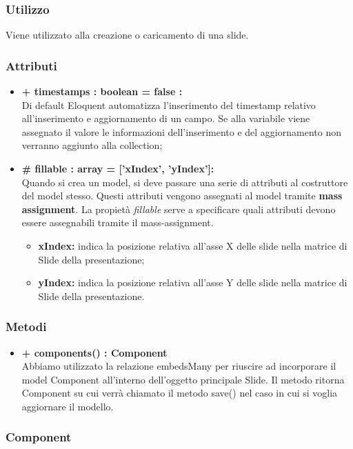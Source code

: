 	\subsubsection*{Utilizzo}
Viene utilizzato alla creazione o caricamento di una slide.

	\subsubsection*{Attributi}
	\begin{itemize}
		\item \textbf{+ timestamps : boolean = false :}\\
		Di default Eloquent automatizza l'inserimento del timestamp relativo all'inserimento e aggiornamento di un campo. Se alla variabile viene assegnato il valore le informazioni dell'inserimento e del aggiornamento non verranno aggiunto alla collection;
		\item \textbf{\# fillable : array = [’xIndex’, ’yIndex']:}\\
		Quando si crea un model, si deve passare una serie di attributi al costruttore del model stesso. Questi attributi vengono assegnati al model tramite \textbf{mass assignment}. La propietà \textit{fillable} serve a specificare quali attributi devono essere assegnabili tramite il mass-assignment.
		\begin{itemize}
			\item \textbf{xIndex:} indica la posizione relativa all'asse X delle slide nella matrice di Slide della presentazione;
			\item \textbf{yIndex:} indica la posizione relativa all'asse Y delle slide nella matrice di Slide della presentazione.
		\end{itemize}
	\end{itemize}
	\subsubsection*{Metodi}
	\begin{itemize}
		\item \textbf{+ components() : Component}\\
		Abbiamo utilizzato la relazione embedsMany per riuscire ad incorporare il model Component all’interno dell’oggetto principale Slide. Il metodo ritorna Component su cui verrà chiamato il metodo save() nel caso in cui si voglia aggiornare il modello.
	\end{itemize}
\newpage

\subsubsection{Component}

